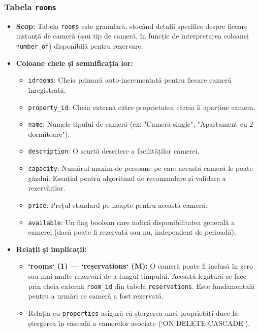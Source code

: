 \documentclass[12pt, a4paper, oneside, romanian]{teza-upb}
\begin{document}
\subsubsection{Tabela \texttt{rooms}}
\begin{itemize}
	\item \textbf{Scop:} Tabela \texttt{rooms} este granulară, stocând detalii specifice despre fiecare instanță de cameră (sau tip de cameră, în funcție de interpretarea coloanei \texttt{number\_of}) disponibilă pentru rezervare.
	\item \textbf{Coloane cheie și semnificația lor:}
	\begin{itemize}
		\item \texttt{idrooms}: Cheia primară auto-incrementată pentru fiecare cameră înregistrată.
		\item \texttt{property\_id}: Cheia externă către proprietatea căreia îi aparține camera.
		\item \texttt{name}: Numele tipului de cameră (ex: "Cameră single", "Apartament cu 2 dormitoare").
		\item \texttt{description}: O scurtă descriere a facilităților camerei.
		\item \texttt{capacity}: Numărul maxim de persoane pe care această cameră le poate găzdui. Esențial pentru algoritmul de recomandare și validare a rezervărilor.
		\item \texttt{price}: Prețul standard pe noapte pentru această cameră.
		\item \texttt{available}: Un flag boolean care indică disponibilitatea generală a camerei (dacă poate fi rezervată sau nu, independent de perioadă).
	\end{itemize}
	\item \textbf{Relații și implicații:}
	\begin{itemize}
		\item \textbf{`rooms` (1) --- `reservations` (M):} O cameră poate fi inclusă în zero sau mai multe rezervări de-a lungul timpului. Această legătură se face prin cheia externă \texttt{room\_id} din tabela \texttt{reservations}. Este fundamentală pentru a urmări ce cameră a fost rezervată.
		\item Relația cu \texttt{properties} asigură că ștergerea unei proprietăți duce la ștergerea în cascadă a camerelor asociate (`ON DELETE CASCADE`).
	\end{itemize}
\end{itemize}
\end{document}
